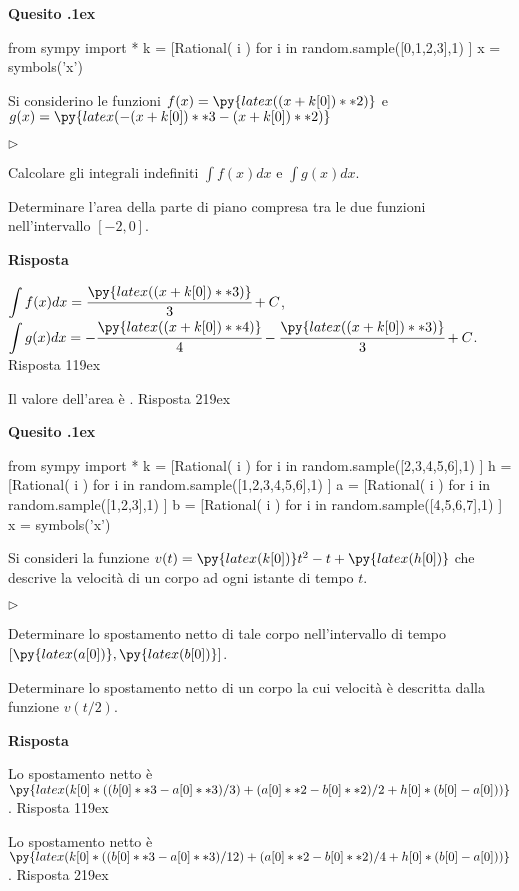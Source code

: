 \documentclass[11pt,twoside,a4paper]{article}
\newcommand{\mylabel}[1]{#1\hfill}
\renewenvironment{itemize}
  {\begin{list}{$\triangleright$}{%
   \setlength{\parskip}{0mm}
   \setlength{\topsep}{.4\baselineskip}
   \setlength{\rightmargin}{0mm}
   \setlength{\listparindent}{0mm}
   \setlength{\itemindent}{0mm}
   \setlength{\labelwidth}{2ex}
   \setlength{\itemsep}{.4\baselineskip}
   \setlength{\parsep}{0mm}
   \setlength{\partopsep}{0mm}
   \setlength{\labelsep}{1ex}
   \setlength{\leftmargin}{\labelwidth+\labelsep}
   \let\makelabel\mylabel}}{%
   \end{list}\vspace*{-1.3mm}}
\newcounter{quesito}
\newenvironment{question}{\bigskip\addtocounter{quesito}{1}\bigskip\bigskip\par\textbf{Quesito \thequesito.\kern1ex}}{\vspace{\parskip}}
\newenvironment{answer}{\par\textbf{Risposta\quad}}{\vspace{\parskip}}
\begin{document}
\begin{question}
\begin{pycode}
from sympy import *
k = [Rational( i ) for i in random.sample([0,1,2,3],1) ]
x = symbols('x')
\end{pycode}
Si considerino le funzioni $f(x) = \py{latex((x+k[0])**2)}$ e $g(x) =  \py{latex(-(x+k[0])**3-(x+k[0])**2)}$
\begin{itemize}
\item[1.] Calcolare gli integrali indefiniti $\displaystyle \int f(x) dx$ e $\displaystyle \int g(x) dx$.
\item[2.] Determinare l'area della parte di piano compresa tra le due funzioni nell'intervallo $[-2, 0]$.
\end{itemize}
\begin{answer}

{\color{blue} $\displaystyle \int f(x) dx = \cfrac{\py{latex((x+k[0])**3)}}{3} + C$, $\displaystyle \int g(x) dx = -\cfrac{\py{latex((x+k[0])**4)}}{4} -\cfrac{\py{latex((x+k[0])**3)}}{3} + C$. 
\hfill Risposta 1\kern19ex}

\smallskip
{\color{blue} Il valore dell'area è .
\hfill Risposta 2\kern19ex}

\end{answer}
\end{question}
\begin{question}
\begin{pycode}
from sympy import *
k = [Rational( i ) for i in random.sample([2,3,4,5,6],1) ]
h = [Rational( i ) for i in random.sample([1,2,3,4,5,6],1) ]
a = [Rational( i ) for i in random.sample([1,2,3],1) ]
b = [Rational( i ) for i in random.sample([4,5,6,7],1) ]
x = symbols('x')
\end{pycode}
Si consideri la funzione $v(t) = \py{latex(k[0])} t^2 - t +\py{latex(h[0])}$ che descrive la velocit\`a di un corpo ad ogni istante di tempo $t$.
\begin{itemize}
\item[1.] Determinare lo spostamento netto di tale corpo nell'intervallo di tempo $[\py{latex(a[0])}, \py{latex(b[0])}]$.
\item[2.] Determinare lo spostamento netto di un corpo la cui velocit\`a \`e descritta dalla funzione $v(t/2)$.
\end{itemize}
\begin{answer}

{\color{blue} Lo spostamento netto è $\py{latex(k[0]*((b[0]**3-a[0]**3)/3)+(a[0]**2-b[0]**2)/2+h[0]*(b[0]-a[0]))}$. 
\hfill Risposta 1\kern19ex}

\smallskip
{\color{blue} Lo spostamento netto è $\py{latex(k[0]*((b[0]**3-a[0]**3)/12)+(a[0]**2-b[0]**2)/4+h[0]*(b[0]-a[0]))}$.
\hfill Risposta 2\kern19ex}

\end{answer}
\end{question}
\end{document}
